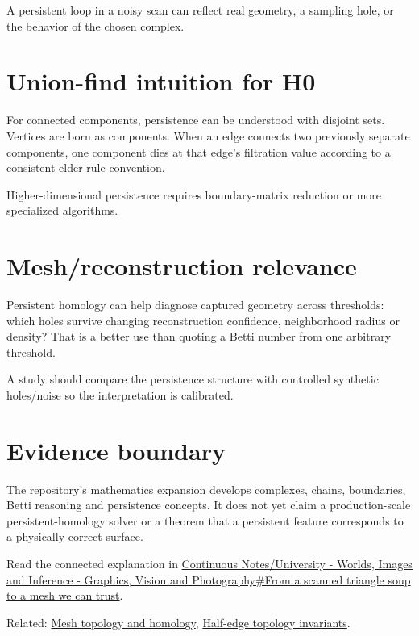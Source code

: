 A persistent loop in a noisy scan can reflect real geometry, a sampling hole, or the behavior of the chosen complex.

\section{Union-find intuition for H0}\label{appendix-e4d8ed8d6787-union-find-intuition-for-h0}

For connected components, persistence can be understood with disjoint sets. Vertices are born as components. When an edge connects two previously separate components, one component dies at that edge's filtration value according to a consistent elder-rule convention.

Higher-dimensional persistence requires boundary-matrix reduction or more specialized algorithms.

\section{Mesh/reconstruction relevance}\label{appendix-e4d8ed8d6787-meshreconstruction-relevance}

Persistent homology can help diagnose captured geometry across thresholds: which holes survive changing reconstruction confidence, neighborhood radius or density? That is a better use than quoting a Betti number from one arbitrary threshold.

A study should compare the persistence structure with controlled synthetic holes/noise so the interpretation is calibrated.

\section{Evidence boundary}\label{appendix-e4d8ed8d6787-evidence-boundary}

The repository's mathematics expansion develops complexes, chains, boundaries, Betti reasoning and persistence concepts. It does not yet claim a production-scale persistent-homology solver or a theorem that a persistent feature corresponds to a physically correct surface.

Read the connected explanation in \href{Continuous\%20Notes/University\%20-\%20Worlds,\%20Images\%20and\%20Inference\%20-\%20Graphics,\%20Vision\%20and\%20Photography\#From\%20a\%20scanned\%20triangle\%20soup\%20to\%20a\%20mesh\%20we\%20can\%20trust}{Continuous Notes/University - Worlds, Images and Inference - Graphics, Vision and Photography\#From a scanned triangle soup to a mesh we can trust}.

Related: \hyperref[appendix-e38976cbbf86]{Mesh topology and homology}, \hyperref[appendix-faac749c9cdd]{Half-edge topology invariants}.
